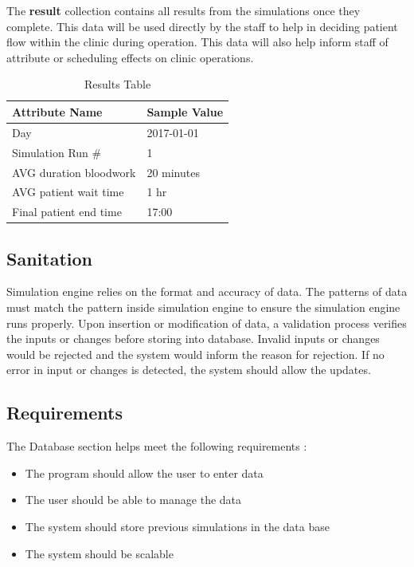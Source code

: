 \documentclass[12pt]{article}
\begin{document}
The \textbf{result} collection contains all results from the simulations once they complete. This data will be used directly by the staff to help in deciding patient flow within the clinic during operation. This data will also help inform staff of attribute or scheduling effects on clinic operations.
\begin{table}[H]
\centering
\caption{Results Table}
\label{result-table}
\begin{tabular}{|l|l|}
\hline
Attribute Name         & Sample Value \\ \hline
Day                    & 2017-01-01   \\ \hline
Simulation Run \#      & 1            \\ \hline
AVG duration bloodwork & 20 minutes   \\ \hline
AVG patient wait time  & 1 hr         \\ \hline
Final patient end time & 17:00        \\ \hline
\end{tabular}
\end{table}
\hfill

\subsection{Sanitation}
Simulation engine relies on the format and accuracy of data. The patterns of data must match the pattern inside simulation engine to ensure the simulation engine runs properly. Upon insertion or modification of data, a validation process verifies the inputs or changes before storing into database. Invalid inputs or changes would be rejected and the system would inform the reason for rejection. If no error in input or changes is detected, the system should allow the updates. 

\subsection{Requirements}
The Database section helps meet the following requirements :
\begin{itemize}
	\item The program should allow the user to enter data 
	\item The user should be able to manage the data
	\item The system should store previous simulations in the data base
	\item The system should be scalable
\end{itemize} 
\end{document}

